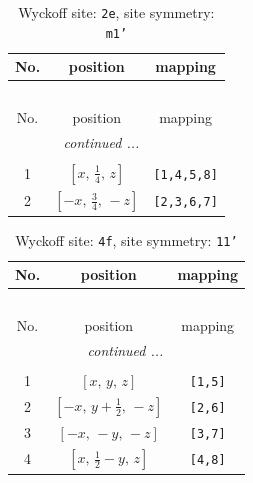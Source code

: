 \documentclass[fleqn,8pt]{jsarticle}
\begin{document}
\begin{longtable}{ccc}
\caption{Wyckoff site: {\tt 2e}, site symmetry: {\tt m1'}}
 \\
 \hline \hline
No. & position & mapping \\ \hline \endfirsthead

\multicolumn{2}{l}{\tablename\ \thetable{}} \\
 \hline \hline
No. & position & mapping \\ \hline \endhead

 \hline \hline
\multicolumn{2}{r}{\footnotesize\it continued ...} \\ \endfoot

 \hline \hline
\multicolumn{2}{r}{} \\ \endlastfoot

1 & $\left[ x,\, \frac{1}{4},\, z \right]$ & {\tt [1,4,5,8]} \\ \hline
2 & $\left[ - x,\, \frac{3}{4},\, - z \right]$ & {\tt [2,3,6,7]} \\
\end{longtable}
\renewcommand{\arraystretch}{1.2}
\begin{longtable}{ccc}
\caption{Wyckoff site: {\tt 4f}, site symmetry: {\tt 11'}}
 \\
 \hline \hline
No. & position & mapping \\ \hline \endfirsthead

\multicolumn{2}{l}{\tablename\ \thetable{}} \\
 \hline \hline
No. & position & mapping \\ \hline \endhead

 \hline \hline
\multicolumn{2}{r}{\footnotesize\it continued ...} \\ \endfoot

 \hline \hline
\multicolumn{2}{r}{} \\ \endlastfoot

1 & $\left[ x,\, y,\, z \right]$ & {\tt [1,5]} \\ \hline
2 & $\left[ - x,\, y + \frac{1}{2},\, - z \right]$ & {\tt [2,6]} \\ \hline
3 & $\left[ - x,\, - y,\, - z \right]$ & {\tt [3,7]} \\ \hline
4 & $\left[ x,\, \frac{1}{2} - y,\, z \right]$ & {\tt [4,8]} \\
\end{longtable}
\end{document}
